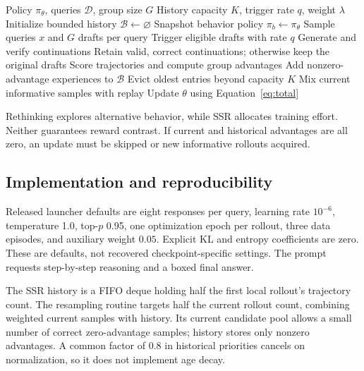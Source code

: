 \documentclass[twocolumn]{article}
\begin{document}
\begin{algorithm}[t]
\caption{VL-Rethinker training}
\label{alg:training}
\begin{algorithmic}[1]
\Require Policy $\pi_\theta$, queries $\mathcal D$, group size $G$
\Require History capacity $K$, trigger rate $q$, weight $\lambda$
\State Initialize bounded history $\mathcal B\gets\varnothing$
    \State Snapshot behavior policy $\pi_b\gets\pi_\theta$
    \State Sample queries $x$ and $G$ drafts per query
        \State Trigger eligible drafts with rate $q$
        \State Generate and verify continuations
        \State Retain valid, correct continuations;
        \Statex \hspace{\algorithmicindent} otherwise keep the original drafts
    \EndIf
    \State Score trajectories and compute group advantages
    \State Add nonzero-advantage experiences to $\mathcal B$
    \State Evict oldest entries beyond capacity $K$
    \State Mix current informative samples with replay
    \State Update $\theta$ using Equation~\ref{eq:total}
\EndFor
\end{algorithmic}
\end{algorithm}

Rethinking explores alternative behavior, while SSR allocates training effort. Neither guarantees reward contrast. If current and historical advantages are all zero, an update must be skipped or new informative rollouts acquired.

\subsection{Implementation and reproducibility}
\label{sec:implementation}

Released launcher defaults are eight responses per query, learning rate $10^{-6}$, temperature 1.0, top-$p$ 0.95, one optimization epoch per rollout, three data episodes, and auxiliary weight $0.05$. Explicit KL and entropy coefficients are zero. These are defaults, not recovered checkpoint-specific settings. The prompt requests step-by-step reasoning and a boxed final answer.

The SSR history is a FIFO deque holding half the first local rollout's trajectory count. The resampling routine targets half the current rollout count, combining weighted current samples with history. Its current candidate pool allows a small number of correct zero-advantage samples; history stores only nonzero advantages. A common factor of 0.8 in historical priorities cancels on normalization, so it does not implement age decay.
\end{document}
